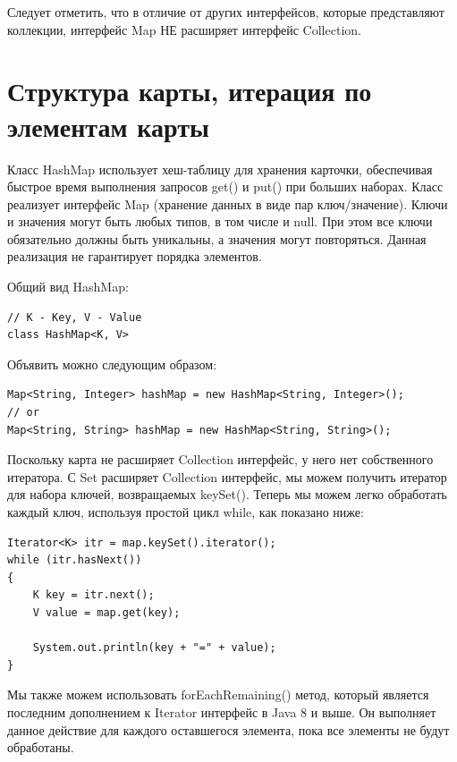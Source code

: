 Следует отметить, что в отличие от других интерфейсов, которые представляют коллекции, интерфейс Map НЕ расширяет интерфейс \newline Collection.

\section{Структура карты, итерация по элементам карты}

Класс HashMap использует хеш-таблицу для хранения карточки, обеспечивая быстрое время выполнения запросов get() и put() при больших наборах. Класс реализует интерфейс Map (хранение данных в виде пар ключ/значение). Ключи и значения могут быть любых типов, в том числе и null. При этом все ключи обязательно должны быть уникальны, а значения могут повторяться. Данная реализация не гарантирует порядка элементов.

Общий вид HashMap:

\begin{lstlisting}
// K - Key, V - Value
class HashMap<K, V>
\end{lstlisting}

Объявить можно следующим образом:

\begin{lstlisting}
Map<String, Integer> hashMap = new HashMap<String, Integer>();
// or
Map<String, String> hashMap = new HashMap<String, String>();
\end{lstlisting}


Поскольку карта не расширяет Collection интерфейс, у него нет собственного итератора. С Set расширяет Collection интерфейс, мы можем получить итератор для набора ключей, возвращаемых keySet(). Теперь мы можем легко обработать каждый ключ, используя простой цикл while, как показано ниже:

\begin{lstlisting}
Iterator<K> itr = map.keySet().iterator();
while (itr.hasNext())
{
    K key = itr.next();
    V value = map.get(key);
 
    System.out.println(key + "=" + value);
}
\end{lstlisting}

Мы также можем использовать forEachRemaining() метод, который является последним дополнением к Iterator интерфейс в Java 8 и выше. Он выполняет данное действие для каждого оставшегося элемента, пока все элементы не будут обработаны.

